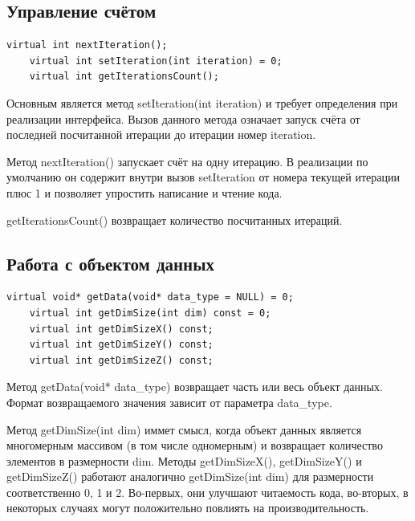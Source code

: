 \documentclass[a4paper,12pt]{extarticle}
\begin{document}
\subsection{Управление счётом}

\begin{lstlisting}[firstnumber=21,title=~~~~Запуск и остановка процесса моделирования происходит с использованием следующих функций:]
    virtual int nextIteration();
    virtual int setIteration(int iteration) = 0;
    virtual int getIterationsCount();
\end{lstlisting}

Основным является метод \textsf{setIteration(int iteration)} и требует определения при реализации интерфейса. Вызов данного метода означает запуск счёта от последней посчитанной итерации до итерации номер \textsf{iteration}.

Метод \textsf{nextIteration()} запускает счёт на одну итерацию. В реализации по умолчанию он содержит внутри вызов \textsf{setIteration} от номера текущей итерации плюс 1 и позволяет упростить написание и чтение кода.

\textsf{getIterationsCount()} возвращает количество посчитанных итераций.



\subsection{Работа с объектом данных}

\begin{lstlisting}[firstnumber=25,title=Получение объекта данных происходит с использованием следующих функций:]
    virtual void* getData(void* data_type = NULL) = 0;
    virtual int getDimSize(int dim) const = 0;
    virtual int getDimSizeX() const;
    virtual int getDimSizeY() const;
    virtual int getDimSizeZ() const;
\end{lstlisting}

Метод \textsf{getData(void* data\_type)} возвращает часть или весь объект данных. Формат возвращаемого значения зависит от параметра \textsf{data\_type}.

Метод \textsf{getDimSize(int dim)} иммет смысл, когда объект данных является многомерным массивом (в том числе одномерным) и возвращает количество элементов в размерности \textsf{dim}. Методы \textsf{getDimSizeX()}, \textsf{getDimSizeY()} и \textsf{getDimSizeZ()} работают аналогично \textsf{getDimSize(int dim)} для размерности соответственно 0, 1 и 2. Во-первых, они улучшают читаемость кода, во-вторых, в некоторых случаях могут положительно повлиять на производительность.
\end{document}
